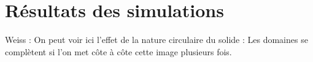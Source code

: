\section{Résultats des simulations}
\label{p2}


Weiss :
On peut voir ici l'effet de la nature circulaire du solide : Les domaines se complètent si l'on met côte à côte cette image plusieurs fois.
